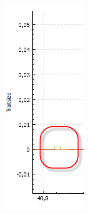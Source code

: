 \documentclass[11pt, a4paper, german]{article}
\theoremstyle{plain}
\begin{document}
\begin{center}
\begin{minipage}{1\textwidth}
\begin{minipage}{0.25\textwidth}
	\end{minipage}
	$ \quad $
	\begin{minipage}{0.25\textwidth}
		\includegraphics[width=1\linewidth]{./Pictures/TSS_MutationZoomVgl2_original}

\end{minipage}
\end{minipage}
\end{center}
\end{document}
